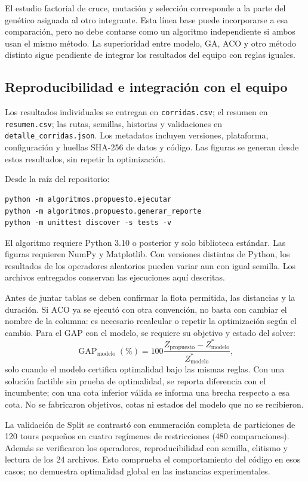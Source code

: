 El estudio factorial de cruce, mutación y selección corresponde a la parte del
genético asignada al otro integrante. Esta línea base puede incorporarse a esa
comparación, pero no debe contarse como un algoritmo independiente si ambos
usan el mismo método. La superioridad entre modelo, GA, ACO y otro método
distinto sigue pendiente de integrar los resultados del equipo con reglas iguales.

\clearpage
\subsection{Reproducibilidad e integración con el equipo}
Los resultados individuales se entregan en \texttt{corridas.csv}; el resumen
en \texttt{resumen.csv}; las rutas, semillas, historias y validaciones en
\texttt{detalle\_corridas.json}. Los metadatos incluyen versiones, plataforma,
configuración y huellas SHA-256 de datos y código. Las figuras se generan desde
estos resultados, sin repetir la optimización.

Desde la raíz del repositorio:
\begin{verbatim}
python -m algoritmos.propuesto.ejecutar
python -m algoritmos.propuesto.generar_reporte
python -m unittest discover -s tests -v
\end{verbatim}
El algoritmo requiere Python 3.10 o posterior y solo biblioteca estándar.
Las figuras requieren NumPy y Matplotlib. Con versiones distintas de Python,
los resultados de los operadores aleatorios pueden variar aun con igual semilla.
Los archivos entregados conservan las ejecuciones aquí descritas.

Antes de juntar tablas se deben confirmar la flota permitida, las distancias y
la duración. Si ACO ya se ejecutó con otra convención, no basta con cambiar el
nombre de la columna: es necesario recalcular o repetir la optimización según
el cambio. Para el GAP con el modelo, se requiere su objetivo y estado del solver:
\[
 \operatorname{GAP}_{\mathrm{modelo}}(\%)=
 100\frac{Z_{\mathrm{propuesto}}-Z^*_{\mathrm{modelo}}}{Z^*_{\mathrm{modelo}}},
\]
solo cuando el modelo certifica optimalidad bajo las mismas reglas. Con una
solución factible sin prueba de optimalidad, se reporta diferencia con el
incumbente; con una cota inferior válida se informa una brecha respecto a esa
cota. No se fabricaron objetivos, cotas ni estados del modelo que no se recibieron.

La validación de Split se contrastó con enumeración completa de particiones
de 120 tours pequeños en cuatro regímenes de restricciones (480 comparaciones).
Además se verificaron los operadores, reproducibilidad con semilla, elitismo
y lectura de los 24 archivos. Esto comprueba el comportamiento del código en
esos casos; no demuestra optimalidad global en las instancias experimentales.
